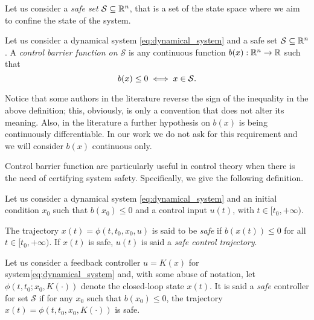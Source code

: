Let us consider a {\em safe set} $\mathcal{S}\subseteq \Bbb{R}^n$, that is a set of the state space where we aim to confine the state of the system. 


\begin{definitionNoPoint}[CBF]
	Let us consider a dynamical system \eqref{eq:dynamical_system} and a safe set $\mathcal{S}\subseteq \Bbb{R}^n$. 
	A {\em control barrier function on $\mathcal{S}$} is any continuous function $b(x): \Bbb{R}^n \rightarrow \Bbb{R}$ such that 
	\begin{equation}\label{eq:barrier_function}
		b(x) \leq 0 \iff x \in \mathcal{S}.\\
	\end{equation}
\end{definitionNoPoint}



Notice that some authors in the literature reverse the sign of the inequality in the above definition; this, obviously, is only a convention that does not alter its meaning. Also, in the literature a further hypothesis on $b(x)$ is being continuously differentiable. In our work we do not ask for this requirement and we will consider $b(x)$ continuous only. 




Control barrier function are particularly useful in control theory when there is the need of certifying system safety. Specifically, we give the following definition. 

\begin{definitionNoPoint}
	Let us consider a dynamical system \eqref{eq:dynamical_system}
	and an initial condition $x_0$ such that $b(x_0)\leq 0$ and a control input $u(t)$, with $t\in [t_0, +\infty)$. 
	
	The trajectory $x(t)=\phi(t,t_0,x_0,u)$ is said to be {\em safe} if $b(x(t))\leq 0$ for all $t\in [t_0, +\infty)$. If $x(t)$ is safe, $u(t)$ is said a {\em safe control trajectory}.
	
\end{definitionNoPoint}


\begin{definitionNoPoint}
	Let us consider a feedback controller \( u = K(x) \) for system\tildeAdd\eqref{eq:dynamical_system} and, with some abuse of notation, let \(\phi(t, t_0; x_0, K(\cdot))\) denote the closed-loop state \( x(t) \). It is said a {\em safe} controller for set $\mathcal{S}$ if for any $x_0$ such that $b(x_0)\leq 0$, the trajectory  $x(t)=\phi(t,t_0,x_0,K(\cdot))$ is safe.
\end{definitionNoPoint}

